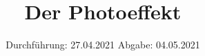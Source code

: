 

\subject{V500}
\title{Der Photoeffekt}
\date{%
  Durchführung: 27.04.2021
  \hspace{3em}
  Abgabe: 04.05.2021
}



\maketitle
\thispagestyle{empty}
\tableofcontents
\newpage






\printbibliography{}


